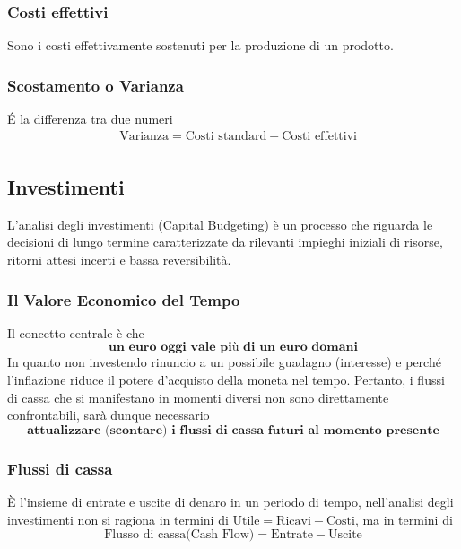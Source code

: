 \documentclass[a4paper,10pt]{article}
\begin{document}
\subsubsection{Costi effettivi}
Sono i costi effettivamente sostenuti per la produzione di un prodotto.
\subsubsection{Scostamento o Varianza}
\'E la differenza tra due numeri
\begin{align*}
     & \text{Varianza} = \text{Costi standard} - \text{Costi effettivi} \\
\end{align*}


\subsection{Investimenti}
L'analisi degli investimenti (Capital Budgeting) è un processo che riguarda le decisioni di lungo termine caratterizzate da rilevanti impieghi iniziali di risorse, ritorni attesi incerti e bassa reversibilità.
\subsubsection{Il Valore Economico del Tempo}
Il concetto centrale è che 
\[\textbf{un euro oggi vale più di un euro domani}\]
In quanto non investendo rinuncio a un possibile guadagno (interesse) e perché l'inflazione riduce il potere d'acquisto della moneta nel tempo.
Pertanto, i flussi di cassa che si manifestano in momenti diversi non sono direttamente confrontabili, sarà dunque necessario 
\[\textbf{attualizzare (scontare) i flussi di cassa futuri al momento presente}\]
\subsubsection{Flussi di cassa}
È l'insieme di entrate e uscite di denaro in un periodo di tempo, nell'analisi degli investimenti non si ragiona in termini di $\text{Utile} = \text{Ricavi} - \text{Costi}$, ma in termini di \[\text{Flusso di cassa(Cash Flow)} = \text{Entrate} - \text{Uscite}\] 
\end{document}
